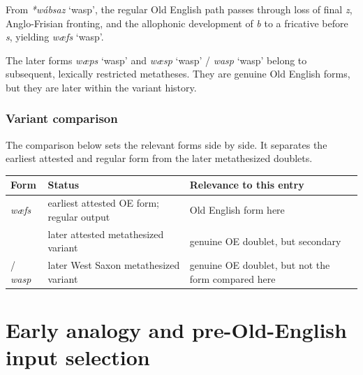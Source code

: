 \documentclass[
  british,
  a4paper,
  openany]{book}
\newcounter{none} %
\providecommand{\Recon}[1]{\emph{*#1}}
{\catcode`→=\active \global\def→{\ensuremath{\rightarrow}}}
\providecommand{\Recon}[1]{\emph{*#1}}
{\catcode`→=\active \global\def→{\ensuremath{\rightarrow}}}
\begin{document}
From {\Recon{wábsaz} `wasp'}, the regular Old English path passes
through loss of final \emph{z}, Anglo-Frisian fronting, and the
allophonic development of \emph{b} to a fricative before \emph{s},
yielding {\emph{wæfs}} `wasp'.

The later forms {\emph{wæps}} `wasp' and {\emph{wæsp}} `wasp' /
{\emph{wasp}} `wasp' belong to subsequent, lexically restricted
metatheses. They are genuine Old English forms, but they are later
within the variant history.

\subsection{Variant comparison}\label{variant-comparison-3}

The comparison below sets the relevant forms side by side. It separates
the earliest attested and regular form from the later metathesized
doublets.

{\def\LTcaptype{none} %
\begin{longtable}[]{@{}
  >{\raggedright\arraybackslash}p{}
  >{\raggedright\arraybackslash}p{}
  >{\raggedright\arraybackslash}p{}@{}}
\toprule\noalign{}
\begin{minipage}[b]{\linewidth}\raggedright
Form
\end{minipage} & \begin{minipage}[b]{\linewidth}\raggedright
Status
\end{minipage} & \begin{minipage}[b]{\linewidth}\raggedright
Relevance to this entry
\end{minipage} \\
\midrule\noalign{}
\endhead
\bottomrule\noalign{}
\endlastfoot
{\emph{wæfs}} & earliest attested OE form; regular output & Old English
form here \\
{\emph{wæps}} & later attested metathesized variant & genuine OE
doublet, but secondary \\
{\emph{wæsp}} / {\emph{wasp}} & later West Saxon metathesized variant &
genuine OE doublet, but not the form compared here \\
\end{longtable}
}

\clearpage

\chapter{Early analogy and pre-Old-English input
selection}\label{early-analogy-and-pre-old-english-input-selection}
\end{document}
